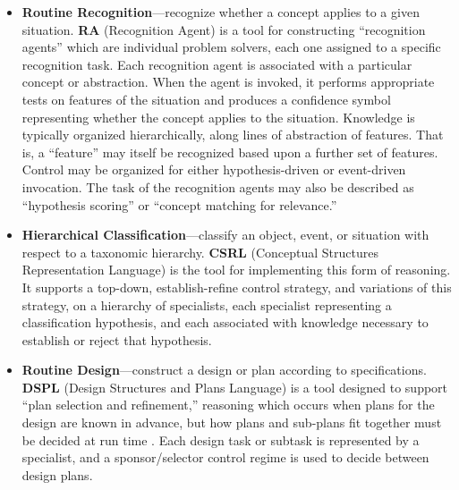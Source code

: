 \begin{itemize}

\item {\bf Routine Recognition}---recognize whether a concept applies
to a given situation.  {\bf RA} (Recognition Agent) is a tool for
constructing ``recognition agents'' which are individual problem
solvers, each one assigned to a specific recognition task.  Each
recognition agent is associated with a particular concept or
abstraction.  When the agent is invoked, it performs appropriate tests
on features of the situation and produces a confidence symbol
representing whether the concept applies to the situation.  Knowledge
is typically organized hierarchically, along lines of abstraction of
features. That is, a ``feature'' may itself be recognized based upon a
further set of features.  Control may be organized for either
hypothesis-driven or event-driven invocation.  The task of the
recognition agents may also be described as ``hypothesis scoring'' or
``concept matching for relevance.''

\item {\bf Hierarchical Classification}---classify an object, event,
or situation with respect to a taxonomic hierarchy. {\bf CSRL}
(Conceptual Structures Representation Language) is the tool for
implementing this form of reasoning.  It supports a top-down,
establish-refine control strategy, and variations of this strategy, on
a hierarchy of specialists, each specialist representing a
classification hypothesis, and each associated with knowledge
necessary to establish or reject that hypothesis.

\item {\bf Routine Design}---construct a design or plan according to
specifications.  {\bf DSPL} (Design Structures and Plans Language) is
a tool designed to support ``plan selection and refinement,''
reasoning which occurs when plans for the design are known in advance,
but how plans and sub-plans fit together must be decided at run time
\cite{86-DB-KNOWCO}.  Each design task or subtask is represented by a
specialist, and a sponsor/selector control regime is used to decide
between design plans.


\end{itemize}
